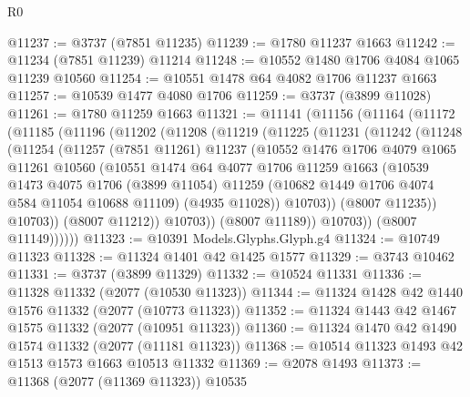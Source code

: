 \begin{lexlean}{R0}
\begin{coremodule}
@11237 := @3737 (@7851 @11235)
@11239 := @1780 @11237 @1663
@11242 := @11234 (@7851 @11239) @11214
@11248 := @10552 @1480 @1706 @4084 @1065 @11239 @10560
@11254 := @10551 @1478 @64 @4082 @1706 @11237 @1663
@11257 := @10539 @1477 @4080 @1706
@11259 := @3737 (@3899 @11028)
@11261 := @1780 @11259 @1663
@11321 := @11141
    (@11156
      (@11164
        (@11172
          (@11185
            (@11196
              (@11202
                (@11208
                  (@11219
                    (@11225
                      (@11231
                        (@11242
                          (@11248
                            (@11254
                              (@11257
                                (@7851 @11261)
                                @11237
                                (@10552
                                  @1476
                                  @1706
                                  @4079
                                  @1065
                                  @11261
                                  @10560
                                  (@10551
                                    @1474
                                    @64
                                    @4077
                                    @1706
                                    @11259
                                    @1663
                                    (@10539
                                      @1473
                                      @4075
                                      @1706
                                      (@3899 @11054)
                                      @11259
                                      (@10682 @1449 @1706 @4074 @584 @11054 @10688 @11109)
                                      (@4935 @11028))
                                    @10703))
                                (@8007 @11235))
                              @10703))
                          (@8007 @11212))
                        @10703))
                    (@8007 @11189))
                  @10703))
              (@8007 @11149))))))
@11323 := @10391 Models.Glyphs.Glyph.g4
@11324 := @10749 @11323
@11328 := @11324 @1401 @42 @1425 @1577
@11329 := @3743 @10462
@11331 := @3737 (@3899 @11329)
@11332 := @10524 @11331
@11336 := @11328 @11332 (@2077 (@10530 @11323))
@11344 := @11324 @1428 @42 @1440 @1576 @11332 (@2077 (@10773 @11323))
@11352 := @11324 @1443 @42 @1467 @1575 @11332 (@2077 (@10951 @11323))
@11360 := @11324 @1470 @42 @1490 @1574 @11332 (@2077 (@11181 @11323))
@11368 := @10514 @11323 @1493 @42 @1513 @1573 @1663 @10513 @11332
@11369 := @2078 @1493
@11373 := @11368 (@2077 (@11369 @11323)) @10535

\end{coremodule}
\end{lexlean}
